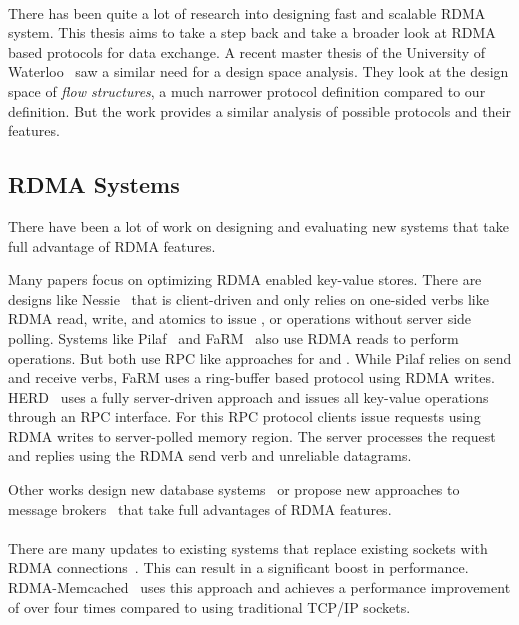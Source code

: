 \paragraph{} There has been quite a lot of research into designing fast and scalable RDMA system. This thesis aims to take
a step back and take a broader look at RDMA based protocols for data exchange. A recent master thesis of the University of 
Waterloo~\cite{sharma2020design} saw a similar need for a design space analysis. They look at the design space of \emph{flow structures},
a much narrower protocol definition compared to our definition. But the work provides a similar analysis of possible
protocols and their features.


\subsection{RDMA Systems}

There have been a lot of work on designing and evaluating new systems that take full advantage of RDMA features.

Many papers focus on optimizing RDMA enabled key-value stores. There are designs like Nessie~\cite{nessie} that is 
client-driven and only relies on one-sided verbs like RDMA read, write, and atomics to issue , 
or  operations without server side polling.
Systems like Pilaf~\cite{pilaf} and FaRM~\cite{farm} also use RDMA reads to perform  operations. But both use 
RPC like approaches for  and . While Pilaf relies on send and receive verbs, FaRM uses a ring-buffer
based protocol using RDMA writes.
HERD~\cite{herd} uses a fully server-driven approach and issues all key-value operations through an RPC interface. For this
RPC protocol clients issue requests using RDMA writes to server-polled memory region. The server processes the request and
replies using the RDMA send verb and unreliable datagrams.

Other works design new database systems~\cite{dbrackjoin} or propose new approaches to message brokers~\cite{broker}
that take full advantages of RDMA features. 

\paragraph{} There are many updates to existing systems that replace existing sockets with RDMA 
connections~\cite{memcached, hbase, hdfs}. This can result in a significant boost in performance. RDMA-Memcached~\cite{memcached} 
uses this approach and achieves a performance improvement of over four times compared to using traditional TCP/IP sockets.

